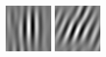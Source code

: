 \begin{figure}[ht]
\begin{center}
  \includegraphics[width=\columnwidth/9]{ch4/figures/real_3_0.jpg}
  \includegraphics[width=\columnwidth/9]{ch4/figures/real_3_1.jpg}

\end{center}
\end{figure}
